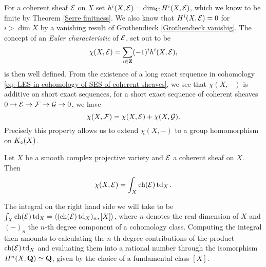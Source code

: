 For a coherent sheaf $\mathcal E$ on $X$ set $h^i(X, \mathcal E) = \dim_\mathbf C H^i(X, \mathcal E)$, which we know to be finite by Theorem \ref{Serre finitness}. We also know that $H^{i}(X, \mathcal E) = 0$ for $i > \dim X$ by a vanishing result of Grothendieck \ref{Grothendieck vanishig}.
The concept of an \emph{Euler characteristic} of $\mathcal E$, set out to be
\[
    \chi(X, \mathcal E) = \sum_{i \in \mathbf Z} (-1)^i h^i(X, \mathcal E),
\] 
is then well defined. From the existence of a long exact sequence in cohomology \eqref{eq: LES in cohomology of SES of coherent sheaves}, we see that $\chi(X, -)$ is additive on short exact sequences, \ie for a short exact sequence of coherent sheaves $0 \to \mathcal E \to \mathcal F \to \mathcal G \to 0$, we have
\[
    \chi(X, \mathcal F) = \chi(X, \mathcal E) + \chi(X, \mathcal G).
\]
Precisely this property allows us to extend $\chi(X,-)$ to a group homomorphism on $K_{\circ}(X)$.
\begin{theorem}
    \label{Hirzebruch-Riemann-Roch}
    Let $X$ be a smooth complex projective variety and $\mathcal E$ a coherent sheaf on $X$. Then
    \begin{equation}
        \label{eq: Hirzebruch-Riemann-Roch formula}
        \chi(X, \E) = \int_X \ch{\E}\tdclass{X}.
    \end{equation}
\end{theorem}


\begin{remark}
    The integral on the right hand side we will take to be $\int_X \ch{\E}\tdclass{X} = \pairing{(\ch{\E}\tdclass{X})_n}{[X]}$, where $n$ denotes the real dimension of $X$ and $(-)_n$ the $n$-th degree component of a cohomology class. 
    Computing the integral then amounts to calculating the $n$-th degree contributions of the product $\ch{\E}\tdclass{X}$ and evaluating them into a rational number through the isomorphism $H^{n}(X, \mathbf Q) \simeq \mathbf Q$, given by the choice of a fundamental class $[X]$.
\end{remark}

